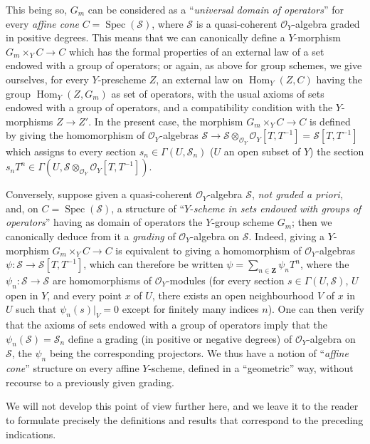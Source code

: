 \begin{remark}[8.3.9]
This being so, $G_m$ can be considered as a ``\emph{universal domain of
operators}'' for every \emph{affine cone}
$C=\operatorname{Spec}(\mathcal{S})$, where $\mathcal{S}$ is a
quasi-coherent $\mathcal{O}_Y$-algebra graded in positive degrees. This
means that we can canonically define a $Y$-morphism
$G_m\times_YC\to C$ which has the formal properties of an external law of a
set endowed with a group of operators; or again, as above for
group schemes, we give ourselves, for every $Y$-prescheme $Z$, an external law
on $\operatorname{Hom}_Y(Z,C)$ having the group
$\operatorname{Hom}_Y(Z,G_m)$ as set of operators, with the usual
axioms of sets endowed with a group of operators, and a compatibility
condition with the $Y$-morphisms $Z\to Z'$. In the present case, the
morphism $G_m\times_YC\to C$ is defined by giving the homomorphism of
$\mathcal{O}_Y$-algebras $\mathcal{S}\to
\mathcal{S}\otimes_{\mathcal{O}_Y}\mathcal{O}_Y[T,T^{-1}]
=\mathcal{S}[T,T^{-1}]$
which assigns to every section $s_n\in\Gamma(U,\mathcal{S}_n)$ ($U$ an open
subset of $Y$) the section
$s_nT^n\in\Gamma(U,\mathcal{S}\otimes_{\mathcal{O}_Y}
\mathcal{O}_Y[T,T^{-1}])$.

Conversely, suppose given a quasi-coherent $\mathcal{O}_Y$-algebra
$\mathcal{S}$, \emph{not graded a priori}, and, on
$C=\operatorname{Spec}(\mathcal{S})$, a structure of ``$Y$-\emph{scheme in
sets endowed with groups of operators}'' having as domain
of operators the $Y$-group scheme $G_m$; then we canonically deduce from it
a \emph{grading} of $\mathcal{O}_Y$-algebra on
$\mathcal{S}$. Indeed, giving a $Y$-morphism $G_m\times_YC\to C$
is equivalent to giving a homomorphism of $\mathcal{O}_Y$-algebras
$\psi:\mathcal{S}\to\mathcal{S}[T,T^{-1}]$, which can therefore be written
$\psi=\sum_{n\in\mathbf{Z}}\psi_nT^n$, where the
$\psi_n:\mathcal{S}\to\mathcal{S}$ are homomorphisms of
$\mathcal{O}_Y$-modules (for every section $s\in\Gamma(U,\mathcal{S})$, $U$ open in $Y$,
and every point $x$ of $U$, there exists an open neighbourhood $V$ of $x$ in $U$
such that $\psi_n(s)|_V=0$ except for finitely many indices $n$). One can
then verify that the axioms of sets endowed with a group of operators
imply that the $\psi_n(\mathcal{S})=\mathcal{S}_n$ define a
grading (in positive or negative degrees) of $\mathcal{O}_Y$-algebra on
$\mathcal{S}$, the $\psi_n$ being the corresponding projectors. We thus have
a notion of ``\emph{affine cone}'' structure on every affine $Y$-scheme,
defined in a ``geometric'' way, without recourse to a previously given grading.

We will not develop this point of view further here, and we leave it to the
reader to formulate precisely the definitions and results that
correspond to the preceding indications.
\end{remark}

